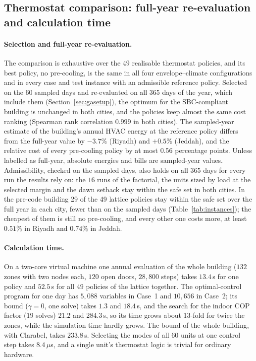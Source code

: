 \documentclass[10pt,a4paper,twocolumn]{article}
\theoremstyle{definition}
\begin{document}
\subsection{Thermostat comparison: full-year re-evaluation and calculation time}\label{sec:optimisation}
\paragraph{Selection and full-year re-evaluation.}\label{sec:stability}\label{sec:trainevalres} The comparison is exhaustive over the $49$ realisable thermostat policies, and its best policy, no pre-cooling, is the same in all four envelope--climate configurations and in every case and test instance with an admissible reference policy. Selected on the $60$ sampled days and re-evaluated on all $365$ days of the year, which include them (Section~\ref{sec:gasetup}), the optimum for the SBC-compliant building is unchanged in both cities, and the policies keep almost the same cost ranking (Spearman rank correlation $0.999$ in both cities). The sampled-year estimate of the building's annual HVAC energy at the reference policy differs from the full-year value by $-3.7\%$ (Riyadh) and $+0.5\%$ (Jeddah), and the relative cost of every pre-cooling policy by at most $0.56$ percentage points. Unless labelled as full-year, absolute energies and bills are sampled-year values.
 Admissibility, checked on the sampled days, also holds on all $365$ days for every run the results rely on: the $16$ runs of the factorial, the units sized by load at the selected margin and the dawn setback stay within the safe set in both cities. In the pre-code building 29 of the 49 lattice policies stay within the safe set over the full year in each city, fewer than on the sampled days (Table~\ref{tab:instances}); the cheapest of them is still no pre-cooling, and every other one costs more, at least $0.51\%$ in Riyadh and $0.74\%$ in Jeddah.

\paragraph{Calculation time.}\label{sec:time} On a two-core virtual machine one annual evaluation of the whole building ($132$ zones with two nodes each, $120$ open doors, $28{,}800$ steps) takes $13.4\,$s for one policy and $52.5\,$s for all $49$ policies of the lattice together. The optimal-control program for one day has $5{,}088$ variables in Case~1 and $10{,}656$ in Case~2; its bound ($\gamma=0$, one solve) takes $1.3$ and $18.4\,$s, and the search for the indoor COP factor ($19$ solves) $21.2$ and $284.3\,$s, so its time grows about 13-fold for twice the zones, while the simulation time hardly grows. The bound of the whole building, with Clarabel, takes $233.8\,$s. Selecting the modes of all $60$ units at one control step takes $8.4\,\mu$s, and a single unit's thermostat logic is trivial for ordinary hardware.
\end{document}
